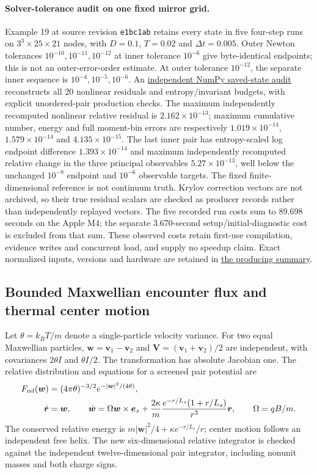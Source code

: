 \documentclass[11pt,letterpaper]{article}
\begin{document}
\paragraph{Solver-tolerance audit on one fixed mirror grid.}
Example 19 at source revision \texttt{e1bc1ab} retains every state in five
four-step runs on $3^3\times25\times21$ nodes, with $D=0.1$, $T=0.02$
and $\Delta t=0.005$. Outer Newton tolerances $10^{-10},10^{-11},10^{-12}$
at inner tolerance $10^{-6}$ give byte-identical endpoints; this is not an
outer-error-order estimate. At outer tolerance $10^{-12}$, the separate
inner sequence is $10^{-4},10^{-5},10^{-6}$. An
\href{https://github.com/rogeriojorge/sato-morrison/blob/main/results/solver_accuracy/audit.json}{independent NumPy saved-state audit}
reconstructs all 20 nonlinear residuals and entropy/invariant budgets, with
explicit unordered-pair production checks. The maximum independently
recomputed nonlinear relative residual is $2.162\times10^{-13}$; maximum
cumulative number, energy and full moment-bin errors are respectively
$1.019\times10^{-14}$, $1.579\times10^{-14}$ and $4.135\times10^{-15}$.
The last inner pair has entropy-scaled log endpoint difference
$1.393\times10^{-14}$ and maximum independently recomputed relative change
in the three principal observables $5.27\times10^{-13}$, well below the
unchanged $10^{-8}$ endpoint and $10^{-6}$ observable targets. The fixed
finite-dimensional reference is not continuum truth. Krylov correction
vectors are not archived, so their true residual scalars are checked as
producer records rather than independently replayed vectors.
The five recorded run costs sum to 89.698 seconds on the Apple M4; the
separate 3.670-second setup/initial-diagnostic cost is excluded from that
sum. These observed costs retain first-use compilation, evidence writes and
concurrent load, and supply no speedup claim. Exact normalized inputs,
versions and hardware are retained in
\href{https://github.com/rogeriojorge/sato-morrison/blob/main/results/solver_accuracy/summary.json}{the producing summary}.

\subsection*{Bounded Maxwellian encounter flux and thermal center motion}
Let $\theta=k_BT/m$ denote a single-particle velocity variance. For two equal
Maxwellian particles, $\bm w=\bm v_1-\bm v_2$ and
$\bm V=(\bm v_1+\bm v_2)/2$ are independent, with covariances
$2\theta I$ and $\theta I/2$. The transformation has absolute Jacobian one.
The relative distribution and equations for a screened pair potential are
\begin{align}
 F_{\rm rel}(\bm w)&=(4\pi\theta)^{-3/2}e^{-|\bm w|^2/(4\theta)},\\
 \dot{\bm r}&=\bm w,\qquad
 \dot{\bm w}=\Omega\bm w\times\bm e_z+
 \frac{2\kappa}{m}\frac{e^{-r/L_s}(1+r/L_s)}{r^3}\bm r,
 \qquad \Omega=qB/m.
\end{align}
The conserved relative energy is $m|\bm w|^2/4+\kappa e^{-r/L_s}/r$;
center motion follows an independent free helix. The new six-dimensional
relative integrator is checked against the independent twelve-dimensional
pair integrator, including nonunit masses and both charge signs.
\end{document}
